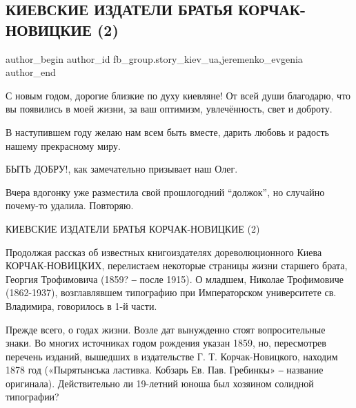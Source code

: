  
 
 
 
 
 
\subsection{КИЕВСКИЕ ИЗДАТЕЛИ БРАТЬЯ КОРЧАК-НОВИЦКИЕ (2)}
\label{sec:01_01_2022.fb.fb_group.story_kiev_ua.1.izdateli_bratja_korchak_novickie}
 
\ifcmt
 author_begin
   author_id fb_group.story_kiev_ua,jeremenko_evgenia
 author_end
\fi


С новым годом, дорогие близкие по духу киевляне! От всей души благодарю, что вы
появились в моей жизни, за ваш оптимизм, увлечённость, свет и доброту. 

В наступившем году желаю нам всем быть вместе, дарить любовь и радость нашему
прекрасному миру. 

БЫТЬ ДОБРУ!, как замечательно призывает наш Олег. 

Вчера вдогонку уже разместила свой прошлогодний \enquote{должок}, но случайно почему-то
удалила. Повторяю.

КИЕВСКИЕ ИЗДАТЕЛИ БРАТЬЯ КОРЧАК-НОВИЦКИЕ (2)

Продолжая рассказ об известных книгоиздателях дореволюционного Киева
КОРЧАК-НОВИЦКИХ, перелистаем некоторые страницы жизни старшего брата, Георгия
Трофимовича (1859? ‒ после 1915). О младшем, Николае Трофимовиче (1862-1937),
возглавлявшем типографию при Императорском университете св. Владимира,
говорилось в 1-й части.


Прежде всего, о годах жизни. Возле дат вынужденно стоят вопросительные знаки.
Во многих источниках годом рождения указан 1859, но, пересмотрев перечень
изданий, вышедших в издательстве Г. Т. Корчак-Новицкого, находим 1878 год
(«Пырятынська ластивка. Кобзарь Ев. Пав. Гребинкы» ‒ название оригинала).
Действительно ли 19-летний юноша был хозяином солидной типографии? 

